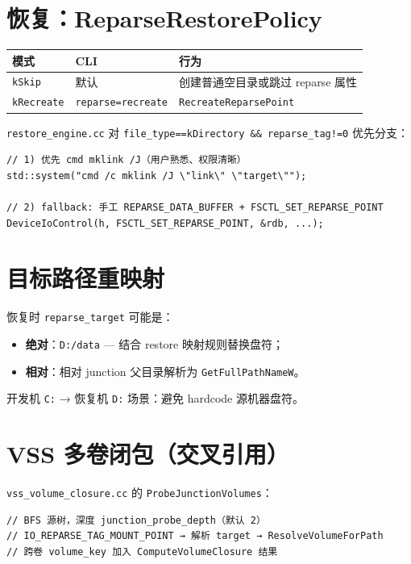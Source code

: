 \section{恢复：ReparseRestorePolicy}

\begin{longtable}{@{}llp{7cm}@{}}
\toprule
模式 & CLI & 行为 \\
\midrule
\texttt{kSkip} & 默认 & 创建普通空目录或跳过 reparse 属性 \\
\texttt{kRecreate} & \texttt{reparse=recreate} & \texttt{RecreateReparsePoint} \\
\bottomrule
\end{longtable}

\texttt{restore\_engine.cc} 对 \texttt{file\_type==kDirectory \&\& reparse\_tag!=0} 优先分支：

\begin{lstlisting}[caption={RecreateReparsePoint 双路径 (win\_meta.cc)}]
// 1) 优先 cmd mklink /J（用户熟悉、权限清晰）
std::system("cmd /c mklink /J \"link\" \"target\"");

// 2) fallback: 手工 REPARSE_DATA_BUFFER + FSCTL_SET_REPARSE_POINT
DeviceIoControl(h, FSCTL_SET_REPARSE_POINT, &rdb, ...);
\end{lstlisting}

\section{目标路径重映射}

恢复时 \texttt{reparse\_target} 可能是：

\begin{itemize}[nosep]
  \item \textbf{绝对}：\texttt{D:/data} — 结合 restore 映射规则替换盘符；
  \item \textbf{相对}：相对 junction 父目录解析为 \texttt{GetFullPathNameW}。
\end{itemize}

开发机 \texttt{C:} → 恢复机 \texttt{D:} 场景：避免 hardcode 源机器盘符。

\section{VSS 多卷闭包（交叉引用）}

\texttt{vss\_volume\_closure.cc} 的 \texttt{ProbeJunctionVolumes}：

\begin{lstlisting}[caption={ProbeJunctionVolumes（概念）}]
// BFS 源树，深度 junction_probe_depth（默认 2）
// IO_REPARSE_TAG_MOUNT_POINT → 解析 target → ResolveVolumeForPath
// 跨卷 volume_key 加入 ComputeVolumeClosure 结果
\end{lstlisting}

